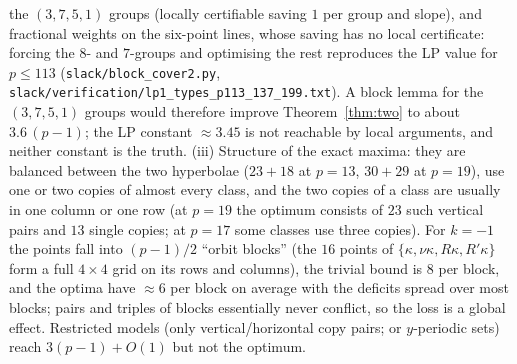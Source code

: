 \documentclass[11pt]{article}
\theoremstyle{remark}
\begin{document}
the $(3,7,5,1)$ groups (locally certifiable saving $1$ per group and slope), and fractional weights on the six-point lines, whose saving
has no local certificate: forcing the $8$- and $7$-groups and optimising the rest reproduces the LP value for $p\le113$
(\texttt{slack/block\_cover2.py}, \texttt{slack/verification/lp1\_types\_p113\_137\_199.txt}).  A block lemma for the $(3,7,5,1)$ groups
would therefore improve Theorem~\ref{thm:two} to about $3.6\,(p-1)$; the LP constant $\approx3.45$ is not reachable by local
arguments, and neither constant is the truth.  (iii) Structure of the exact maxima: they are balanced between the two hyperbolae ($23+18$ at $p=13$, $30+29$ at
$p=19$), use one or two copies of almost every class, and the two copies of a class are usually in one column or one row (at $p=19$
the optimum consists of $23$ such vertical pairs and $13$ single copies; at $p=17$ some classes use three copies).  For $k=-1$ the
points fall into $(p-1)/2$ ``orbit blocks'' (the $16$ points of $\{\kappa,\nu\kappa,R\kappa,R'\kappa\}$ form a full $4\times4$ grid on
its rows and columns), the trivial bound is $8$ per block, and the optima have $\approx6$ per block on average with the deficits
spread over most blocks; pairs and triples of blocks essentially never conflict, so the loss is a global effect.  Restricted models
(only vertical/horizontal copy pairs; or $y$-periodic sets) reach $3(p-1)+O(1)$ but not the optimum.  
\end{document}
